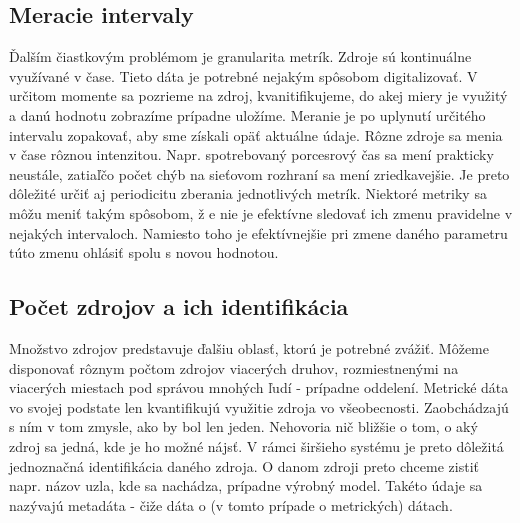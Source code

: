 \documentclass[12pt,twoside,color,cover,table]{fithesis3}
\begin{document}
\subsection{Meracie intervaly}
Ďalším čiastkovým problémom je granularita metrík. Zdroje sú kontinuálne využívané v čase. Tieto dáta je potrebné nejakým spôsobom digitalizovať. V určitom momente sa pozrieme na zdroj, kvanitifikujeme, do akej miery je využitý a danú
hodnotu zobrazíme prípadne uložíme. Meranie je po uplynutí určitého intervalu zopakovať, aby sme získali opäť aktuálne údaje. Rôzne zdroje sa menia v čase rôznou intenzitou. Napr. spotrebovaný porcesrový čas
sa mení prakticky neustále, zatiaľčo počet chýb na sieťovom rozhraní sa mení zriedkavejšie. Je preto dôležité určiť aj periodicitu zberania jednotlivých metrík. Niektoré metriky sa môžu meniť takým spôsobom, ž
e nie je efektívne sledovať ich zmenu pravidelne v nejakých intervaloch. Namiesto toho je efektívnejšie pri zmene daného parametru túto zmenu ohlásiť spolu s novou hodnotou.

\subsection{Počet zdrojov a ich identifikácia}
Množstvo zdrojov predstavuje ďalšiu oblasť, ktorú je potrebné zvážiť. Môžeme disponovať rôznym počtom zdrojov viacerých druhov, rozmiestnenými na viacerých miestach pod správou mnohých ľudí - prípadne oddelení. Metrické dáta vo svojej
podstate len kvantifikujú využitie zdroja vo všeobecnosti. Zaobchádzajú s ním v tom zmysle, ako by bol len jeden. Nehovoria nič bližšie o tom, o aký zdroj sa jedná, kde je ho možné nájsť. V rámci širšieho
systému je preto dôležitá jednoznačná identifikácia daného zdroja. O danom zdroji preto chceme zistiť napr. názov uzla, kde sa nachádza, prípadne výrobný model. Takéto údaje sa nazývajú metadáta - čiže dáta o (v tomto 
prípade o metrických) dátach.
\end{document}
